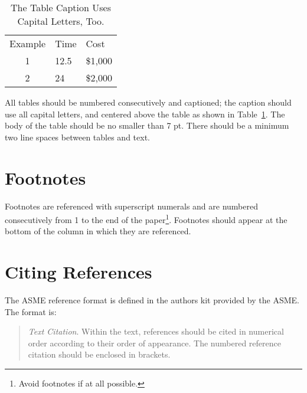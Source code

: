 \documentclass[twocolumn,10pt]{asme2e}
\begin{document}
\begin{table}[t]
 \caption{The Table Caption Uses Capital Letters, Too.}
 \begin{center}
  \label{table_ASME}
  \begin{tabular}{c l l}
   & & \\ %
   \hline Example & Time & Cost \\
   \hline 1 &
   12.5 &
   \$1,000 \\
   2 &
   24 &
   \$2,000 \\
   \hline
  \end{tabular}
 \end{center}
\end{table}

All tables should be numbered consecutively and captioned; the caption should use all capital letters, and centered above the table as shown in Table~\ref{table_ASME}.
The body of the table should be no smaller than 7 pt.
There should be a minimum two line spaces between tables and text.

\section*{Footnotes\protect\footnotemark}

Footnotes are referenced with superscript numerals and are numbered consecutively from 1 to the end of the paper\footnote{Avoid footnotes if at all possible.}.
Footnotes should appear at the bottom of the column in which they are referenced.


\section*{Citing References}

The ASME reference format is defined in the authors kit provided by the ASME. The format is:

\begin{quotation}
 {\em Text Citation}.
 Within the text, references should be cited in numerical order according to their order of appearance.
 The numbered reference citation should be enclosed in brackets.
\end{quotation}
\end{document}
